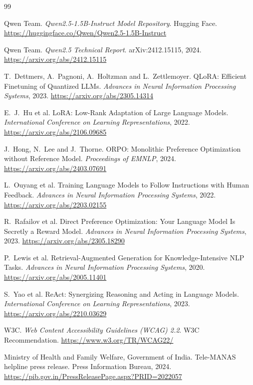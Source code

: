 \documentclass[11pt,a4paper]{article}
\begin{document}
\clearpage
{}
\renewcommand{\refname}{Bibliography}
\begin{thebibliography}{99}
\small

 Qwen Team. \emph{Qwen2.5-1.5B-Instruct Model Repository}. Hugging Face. \url{https://huggingface.co/Qwen/Qwen2.5-1.5B-Instruct}

 Qwen Team. \emph{Qwen2.5 Technical Report}. arXiv:2412.15115, 2024. \url{https://arxiv.org/abs/2412.15115}

 T.~Dettmers, A.~Pagnoni, A.~Holtzman and L.~Zettlemoyer. QLoRA: Efficient Finetuning of Quantized LLMs. \emph{Advances in Neural Information Processing Systems}, 2023. \url{https://arxiv.org/abs/2305.14314}

 E.~J.~Hu et al. LoRA: Low-Rank Adaptation of Large Language Models. \emph{International Conference on Learning Representations}, 2022. \url{https://arxiv.org/abs/2106.09685}

 J.~Hong, N.~Lee and J.~Thorne. ORPO: Monolithic Preference Optimization without Reference Model. \emph{Proceedings of EMNLP}, 2024. \url{https://arxiv.org/abs/2403.07691}

 L.~Ouyang et al. Training Language Models to Follow Instructions with Human Feedback. \emph{Advances in Neural Information Processing Systems}, 2022. \url{https://arxiv.org/abs/2203.02155}

 R.~Rafailov et al. Direct Preference Optimization: Your Language Model Is Secretly a Reward Model. \emph{Advances in Neural Information Processing Systems}, 2023. \url{https://arxiv.org/abs/2305.18290}

 P.~Lewis et al. Retrieval-Augmented Generation for Knowledge-Intensive NLP Tasks. \emph{Advances in Neural Information Processing Systems}, 2020. \url{https://arxiv.org/abs/2005.11401}

 S.~Yao et al. ReAct: Synergizing Reasoning and Acting in Language Models. \emph{International Conference on Learning Representations}, 2023. \url{https://arxiv.org/abs/2210.03629}

 W3C. \emph{Web Content Accessibility Guidelines (WCAG) 2.2}. W3C Recommendation. \url{https://www.w3.org/TR/WCAG22/}

 Ministry of Health and Family Welfare, Government of India. Tele-MANAS helpline press release. Press Information Bureau, 2024. \url{https://pib.gov.in/PressReleasePage.aspx?PRID=2022057}


\end{thebibliography}
\end{document}
